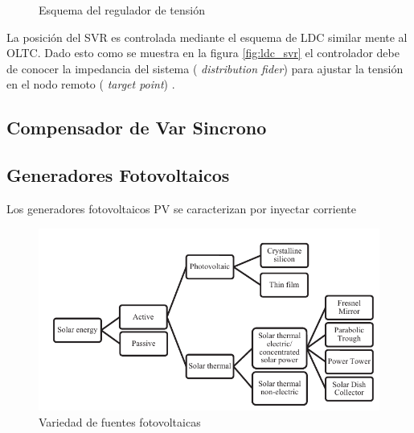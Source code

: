\documentclass[12pt, letterpaper]{report}
\begin{document}
\begin{figure}[H]

\centering
{}
\hspace{5mm}
\hfill
{}
\caption{Esquema del regulador de tensión}
\label{fig:regulador}

\end{figure}

La posición del \ac{SVR} es  controlada  mediante el esquema de \ac{LDC} similar mente al \ac{OLTC}. Dado esto como se muestra en la figura \ref{fig:ldc_svr} el controlador  debe de conocer la impedancia del sistema ( \textit{distribution fider}) para ajustar la tensión en el nodo remoto ( \textit{target point}) \cite{Vkdulqj}.
\subsection{Compensador de Var Sincrono}

\subsection{Generadores Fotovoltaicos }

Los generadores fotovoltaicos \ac{PV} se caracterizan por inyectar corriente 

\begin{figure}[h]
\centering
\includegraphics[width=0.7\linewidth]{imagenes/cap_1/sistemas_solares}
\caption{Variedad de fuentes fotovoltaicas}
\label{fig:sistemas_solares}
\end{figure}
\end{document}
